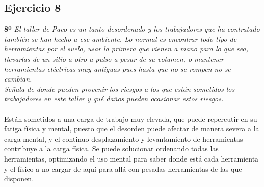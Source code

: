 \documentclass{article}
\begin{document}
        \subsection{Ejercicio 8}
        \textbf{8º} \textit{El taller de Paco es un tanto desordenado y los trabajadores que ha contratado también se han hecho a ese
        ambiente. Lo normal es encontrar todo tipo de herramientas por el suelo, usar la primera que vienen a mano para lo que sea, 
        llevarlas de un sitio a otro a pulso a pesar de su volumen, o mantener herramientas eléctricas muy antiguas pues hasta que no 
        se rompen no se cambian.\\
        Señala de donde pueden provenir los riesgos a los que están sometidos los trabajadores en este taller y qué daños pueden ocasionar
        estos riesgos.}
        \\\\
        Están sometidos a una carga de trabajo muy elevada, que puede repercutir en su fatiga física y mental, puesto que el desorden puede 
        afectar de manera severa a la carga mental, y el continuo desplazamiento y levantamiento de herramientas contribuye a la carga física.
        Se puede solucionar ordenando todas las herramientas, optimizando el uso mental para saber donde está cada herramienta y el físico a no
        cargar de aquí para allá con pesadas herramientas de las que disponen.
\end{document}
